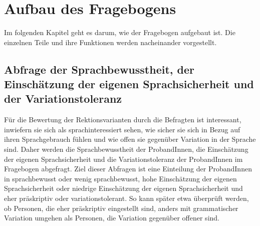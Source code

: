\section{Aufbau des Fragebogens}
\label{sec:Fragebogen}
Im folgenden Kapitel geht es darum, wie der Fragebogen aufgebaut ist. Die einzelnen Teile und ihre Funktionen werden nacheinander vorgestellt. 
\subsection{Abfrage der Sprachbewusstheit, der Einschätzung der eigenen Sprachsicherheit und der Variationstoleranz}
\label{sec:RE}
Für die Bewertung der Rektionsvarianten durch die Befragten ist interessant, inwiefern sie sich als sprachinteressiert sehen, wie sicher sie sich in Bezug auf ihren Sprachgebrauch fühlen und wie offen sie gegenüber Variation in der Sprache sind. 
Daher werden die Sprachbewusstheit der ProbandInnen, die Einschätzung der eigenen Sprachsicherheit und die Variationstoleranz der ProbandInnen im Fragebogen abgefragt. 
Ziel dieser Abfragen ist eine Einteilung der ProbandInnen in sprachbewusst oder wenig sprachbewusst, hohe Einschätzung der eigenen Sprachsicherheit oder niedrige Einschätzung der eigenen Sprachsicherheit und eher präskriptiv oder variationstolerant. 
So kann später etwa überprüft werden, ob Personen, die eher präskriptiv eingestellt sind, anders mit grammatischer Variation umgehen als Personen, die Variation gegenüber offener sind. 

